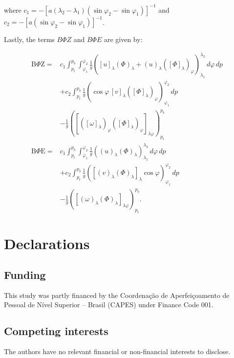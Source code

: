 \documentclass[pdflatex,sn-chicago]{sn-jnl}%
\theoremstyle{plain}
\theoremstyle{definition}
\theoremstyle{remark}
\theoremstyle{definition}
\begin{document}
where $c_1=-\left[a\left(\lambda_2-\lambda_1\right)
\left(\sin\varphi_2-\sin\varphi_1\right)\right]^{-1}$
and $c_2=-\left[a\left(\sin\varphi_2-\sin\varphi_1\right)\right]^{-1}$.


Lastly, the terms $B\Phi Z$ and $B\Phi E$ are given by:

\begin{align}
\mathrm{B}\Phi\mathrm{Z}
={}& c_1 \int_{p_t}^{p_b} \int_{\varphi_1}^{\varphi_2}
\frac{1}{g}
\left(
[u]_\lambda(\Phi)_\lambda
+(u)_\lambda\left([\Phi]_\lambda\right)_\varphi
\right)_{\lambda_1}^{\lambda_2}
\,d\varphi\,dp
\nonumber \\
&+c_2 \int_{p_t}^{p_b}
\frac{1}{g}
\left(
\cos\varphi\,[v]_\lambda
\left([\Phi]_\lambda\right)_\varphi
\right)_{\varphi_1}^{\varphi_2}
\,dp
\nonumber \\
&-\frac{1}{g}
\left(
\left[
\left([\omega]_\lambda\right)_\varphi
\left([\Phi]_\lambda\right)_\varphi
\right]_{\lambda\varphi}
\right)_{p_t}^{p_b}
\\
\mathrm{B}\Phi\mathrm{E}
={}& c_1 \int_{p_t}^{p_b} \int_{\varphi_1}^{\varphi_2}
\frac{1}{g}
\left(
(u)_\lambda(\Phi)_\lambda
\right)_{\lambda_1}^{\lambda_2}
\,d\varphi\,dp
\nonumber \\
&+c_2 \int_{p_t}^{p_b}
\frac{1}{g}
\left(
\left[(v)_\lambda(\Phi)_\lambda\right]_\lambda
\cos\varphi
\right)_{\varphi_1}^{\varphi_2}
\,dp
\nonumber \\
&-\frac{1}{g}
\left(
\left[(\omega)_\lambda(\Phi)_\lambda\right]_{\lambda\varphi}
\right)_{p_t}^{p_b}.
\end{align}

\section*{Declarations}

\subsection*{Funding}

This study was partly financed by the Coordenação de Aperfeiçoamento de Pessoal de Nível Superior – Brasil (CAPES) under Finance Code 001.

\subsection*{Competing interests}

The authors have no relevant financial or non-financial interests to disclose.
\end{document}
